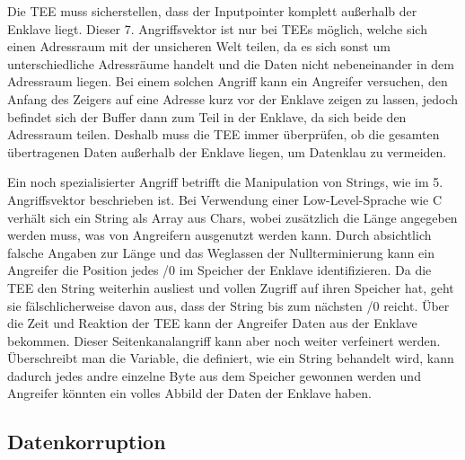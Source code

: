Die TEE muss sicherstellen, dass der Inputpointer komplett außerhalb der Enklave liegt. Dieser 7. Angriffsvektor ist nur bei TEEs möglich, welche sich einen Adressraum mit der unsicheren Welt teilen, da es sich sonst um unterschiedliche Adressräume handelt und die Daten nicht nebeneinander in dem Adressraum liegen. Bei einem solchen Angriff kann ein Angreifer versuchen, den Anfang des Zeigers auf eine Adresse kurz vor der Enklave zeigen zu lassen, jedoch befindet sich der Buffer dann zum Teil in der Enklave, da sich beide den Adressraum teilen. Deshalb muss die TEE immer überprüfen, ob die gesamten übertragenen Daten außerhalb der Enklave liegen, um Datenklau zu vermeiden.

Ein noch spezialisierter Angriff betrifft die Manipulation von Strings, wie im 5. Angriffsvektor beschrieben ist. Bei Verwendung einer Low-Level-Sprache wie C verhält sich ein String als Array aus Chars, wobei zusätzlich die Länge angegeben werden muss, was von Angreifern ausgenutzt werden kann. Durch absichtlich falsche Angaben zur Länge und das Weglassen der Nullterminierung kann ein Angreifer die Position jedes /0 im Speicher der Enklave identifizieren. Da die TEE den String weiterhin ausliest und vollen Zugriff auf ihren Speicher hat, geht sie fälschlicherweise davon aus, dass der String bis zum nächsten /0 reicht. Über die Zeit und Reaktion der TEE kann der Angreifer Daten aus der Enklave bekommen. Dieser Seitenkanalangriff kann aber noch weiter verfeinert werden. Überschreibt man die Variable, die definiert, wie ein String behandelt wird, kann dadurch jedes andre einzelne Byte aus dem Speicher gewonnen werden und Angreifer könnten ein volles Abbild der Daten der Enklave haben.

\subsection{Datenkorruption}
